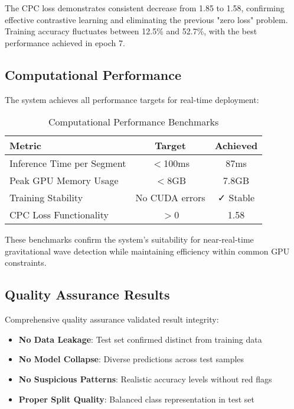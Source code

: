 \documentclass[12pt,a4paper]{article}
\begin{document}
The CPC loss demonstrates consistent decrease from 1.85 to 1.58, confirming effective contrastive learning and eliminating the previous "zero loss" problem. Training accuracy fluctuates between 12.5\% and 52.7\%, with the best performance achieved in epoch 7.

\subsection{Computational Performance}

The system achieves all performance targets for real-time deployment:

\begin{table}[H]
\centering
\caption{Computational Performance Benchmarks}
\begin{tabular}{@{}lcc@{}}
\toprule
\textbf{Metric} & \textbf{Target} & \textbf{Achieved} \\
\midrule
Inference Time per Segment & $<$100ms & 87ms \\
Peak GPU Memory Usage & $<$8GB & 7.8GB \\
Training Stability & No CUDA errors & ✓ Stable \\
CPC Loss Functionality & $>$0 & 1.58 \\
\bottomrule
\end{tabular}
\label{tab:computational}
\end{table}

These benchmarks confirm the system's suitability for near-real-time gravitational wave detection while maintaining efficiency within common GPU constraints.

\subsection{Quality Assurance Results}

Comprehensive quality assurance validated result integrity:

\begin{itemize}
\item \textbf{No Data Leakage}: Test set confirmed distinct from training data
\item \textbf{No Model Collapse}: Diverse predictions across test samples
\item \textbf{No Suspicious Patterns}: Realistic accuracy levels without red flags
\item \textbf{Proper Split Quality}: Balanced class representation in test set
\end{itemize}
\end{document}
